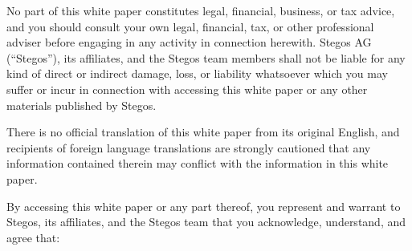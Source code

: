 \documentclass[8pt,fleqn,openany]{book}
\begin{document}
No part of this white paper constitutes legal, financial, business, or tax advice, and you should consult your own legal, financial, tax, or other professional adviser before engaging in any activity in connection herewith. Stegos AG (“Stegos”), its affiliates, and the Stegos team members shall not be liable for any kind of direct or indirect damage, loss, or liability whatsoever which you may suffer or incur in connection with accessing this white paper or any other materials published by Stegos. 

There is no official translation of this white paper from its original English, and recipients of foreign language translations are strongly cautioned that any information contained therein may conflict with the information in this white paper. 

By accessing this white paper or any part thereof, you represent and warrant to Stegos, its affiliates, and the Stegos team that you acknowledge, understand, and agree that: 
\end{document}
